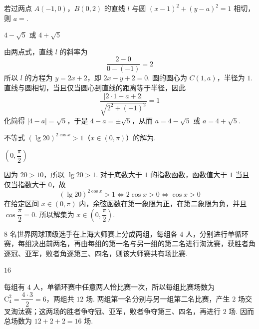\begin{problem}
若过两点 \(A(-1,0)\)，\(B(0,2)\) 的直线 \(l\) 与圆 \((x-1)^{2}+(y-a)^{2}=1\) 相切，则 \(a=\)\fillinblank{}.
\end{problem}

\begin{answer}
\(4-\sqrt{5}\) 或 \(4+\sqrt{5}\)
\end{answer}

\begin{solution}
由两点式，直线 \(l\) 的斜率为
\[
\frac{2-0}{0-(-1)}=2
\]
所以 \(l\) 的方程为 \(y=2x+2\)，即 \(2x-y+2=0\). 圆的圆心为 \(C(1,a)\)，半径为 \(1\). 直线与圆相切，当且仅当圆心到直线的距离等于半径，因此
\[
\frac{|2\cdot1-a+2|}{\sqrt{2^2+(-1)^2}}=1
\]
化简得 \(|4-a|=\sqrt{5}\)，于是 \(4-a=\pm\sqrt{5}\)，从而 \(a=4-\sqrt{5}\) 或 \(a=4+\sqrt{5}\).
\end{solution}

\begin{problem}
不等式 \((\lg 20)^{2\cos x} > 1\)（\(x \in (0,\pi)\)）的解为\fillinblank{}.
\end{problem}

\begin{answer}
\(\left(0,\dfrac{\pi}{2}\right)\)
\end{answer}

\begin{solution}
因为 \(20>10\)，所以 \(\lg20>1\). 对于底数大于 \(1\) 的指数函数，函数值大于 \(1\) 当且仅当指数大于 \(0\)，故
\[
(\lg20)^{2\cos x}>1\Longleftrightarrow2\cos x>0\Longleftrightarrow\cos x>0
\]
在给定区间 \(x\in(0,\pi)\) 内，余弦函数在第一象限为正，在第二象限为负，并且 \(\cos\dfrac{\pi}{2}=0\). 所以解集为 \(x\in\left(0,\dfrac{\pi}{2}\right)\).
\end{solution}

\begin{problem}
\(8\) 名世界网球顶级选手在上海大师赛上分成两组，每组各 \(4\) 人，分别进行单循环赛，每组决出前两名，再由每组的第一名与另一组的第二名进行淘汰赛，获胜者角逐冠、亚军，败者角逐第三、四名，则该大师赛共有\fillinblank{}\(\text{场}\)比赛.
\end{problem}

\begin{answer}
\(16\)
\end{answer}

\begin{solution}
每组有 \(4\) 人，单循环赛中任意两人恰比赛一次，所以每组比赛场数为 \(\mathrm C_4^2=\dfrac{4\cdot3}{2}=6\)，两组共 \(12\) 场. 两组第一名分别与另一组第二名比赛，产生 \(2\) 场交叉淘汰赛；这两场的胜者争夺冠、亚军，败者争夺第三、四名，再进行 \(2\) 场. 因而总场数为 \(12+2+2=16\) 场.
\end{solution}

